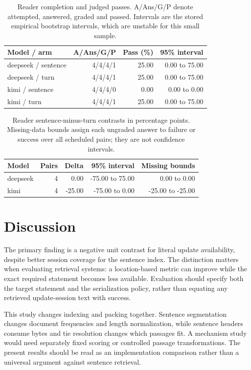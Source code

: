 \documentclass{article}
\begin{document}
\begin{table}[ht]\centering\small
\caption{Reader completion and judged passes. A/Ans/G/P denote attempted, answered, graded and passed. Intervals are the stored empirical bootstrap intervals, which are unstable for this small sample.}
\begin{tabular}{lrrr}
\toprule
Model / arm & A/Ans/G/P & Pass (\%) & 95\% interval\\\midrule
deepseek / sentence & 4/4/4/1 & 25.00 & 0.00 to 75.00\\
deepseek / turn & 4/4/4/1 & 25.00 & 0.00 to 75.00\\
kimi / sentence & 4/4/4/0 & 0.00 & 0.00 to 0.00\\
kimi / turn & 4/4/4/1 & 25.00 & 0.00 to 75.00\\
\bottomrule\end{tabular}\end{table}
\begin{table}[ht]\centering\small
\caption{Reader sentence-minus-turn contrasts in percentage points. Missing-data bounds assign each ungraded answer to failure or success over all scheduled pairs; they are not confidence intervals.}
\begin{tabular}{lrrrr}
\toprule
Model & Pairs & Delta & 95\% interval & Missing bounds\\\midrule
deepseek & 4 & 0.00 & -75.00 to 75.00 & 0.00 to 0.00\\
kimi & 4 & -25.00 & -75.00 to 0.00 & -25.00 to -25.00\\
\bottomrule\end{tabular}\end{table}
\section{Discussion}
The primary finding is a negative unit contrast for literal update availability, despite better session coverage for the sentence index. The distinction matters when evaluating retrieval systems: a location-based metric can improve while the exact required statement becomes less available. Evaluation should specify both the target statement and the serialization policy, rather than equating any retrieved update-session text with success.

This study changes indexing and packing together. Sentence segmentation changes document frequencies and length normalization, while sentence headers consume bytes and tie resolution changes which passages fit. A mechanism study would need separately fixed scoring or controlled passage transformations. The present results should be read as an implementation comparison rather than a universal argument against sentence retrieval.
\end{document}

